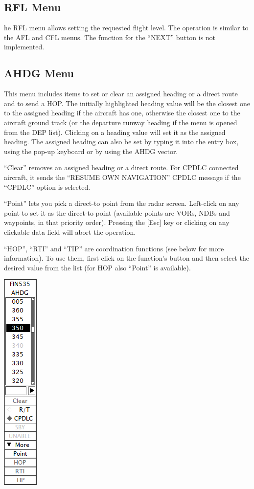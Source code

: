 \documentclass[11pt,a4paper,oldfontcommands]{memoir}
\begin{document}
\subsection{RFL Menu}
\label{menu:rfl}

he RFL menu allows setting the requested flight level. The operation is similar to the
AFL and CFL menus. The function for the “NEXT” button is not implemented.

\subsection{AHDG Menu}
\label{menu:ahdg}

This menu includes items to set or clear an assigned heading or a direct route and to
send a HOP. The initially highlighted heading value will be the closest one to the
assigned heading if the aircraft has one, otherwise the closest one to the aircraft ground
track (or the departure runway heading if the menu is opened from the DEP list).
Clicking on a heading value will set it as the assigned heading. The assigned heading can
also be set by typing it into the entry box, using the pop-up keyboard or by using the
AHDG vector.

“Clear” removes an assigned heading or a direct route. For CPDLC connected aircraft, it
sends the “RESUME OWN NAVIGATION” CPDLC message if the “CPDLC” option is
selected.

“Point” lets you pick a direct-to point from the radar screen. Left-click on any point to
set it as the direct-to point (available points are VORs, NDBs and waypoints, in that
priority order). Pressing the [Esc] key or clicking on any clickable data field will abort the
operation.

“HOP”, “RTI” and “TIP” are coordination functions (see below for more information). To
use them, first click on the function’s button and then select the desired value from the
list (for HOP also “Point” is available).

\includegraphics{img/ahdgdl.png}
\end{document}
